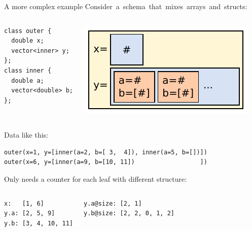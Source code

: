 \documentclass{beamer}
\begin{document}
\begin{frame}[fragile]{A more complex example}
\vspace{0.5 cm}
\mbox{\hspace{-0.5 cm}Consider a schema that mixes arrays and structs:}
\begin{columns}
\scriptsize
\begin{verbatim}
class outer {
  double x;
  vector<inner> y;
};
class inner {
  double a;
  vector<double> b;
};
\end{verbatim}

\includegraphics[width=\linewidth]{record.pdf}
\end{columns}

\vspace{0.3 cm}
{\hspace{-0.5 cm}\begin{minipage}{\linewidth}
{\normalsize Data like this:}

\small
\begin{verbatim}
outer(x=1, y=[inner(a=2, b=[ 3,  4]), inner(a=5, b=[])])
outer(x=6, y=[inner(a=9, b=[10, 11])                  ])
\end{verbatim}

\vspace{0.2 cm}
{\normalsize Only needs a counter for each leaf with different structure:}

\vspace{-0.2 cm}
\begin{columns}[b]
\small
\begin{verbatim}
x:   [1, 6]
y.a: [2, 5, 9]
y.b: [3, 4, 10, 11]
\end{verbatim}

\small
\begin{verbatim}
y.a@size: [2, 1]
y.b@size: [2, 2, 0, 1, 2]
\end{verbatim}
\end{columns}
\end{minipage}}
\end{frame}
\end{document}
